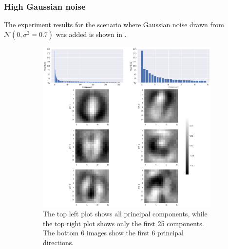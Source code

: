 \documentclass[a4paper,11pt]{article}
\begin{document}
\subsubsection*{High Gaussian noise}

The experiment results for the scenario where Gaussian noise drawn from $\mathcal{N}(0, \sigma^2=0.7)$ was added is shown in .

\begin{figure}
	\centering
	\begin{subfigure}[t]{0.45\textwidth}
		\includegraphics[width=\textwidth]{images/assignment5-3-hgn1.png}
		\caption{The top left plot shows all principal components, while the top right plot shows only the first 25 components. The bottom 6 images show the first 6 principal directions.}
		\label{fig:assignment5-3-hgn1}
	\end{subfigure}
	\hfill
	\begin{subfigure}[t]{0.45\textwidth}

\end{subfigure}
\end{figure}
\end{document}
